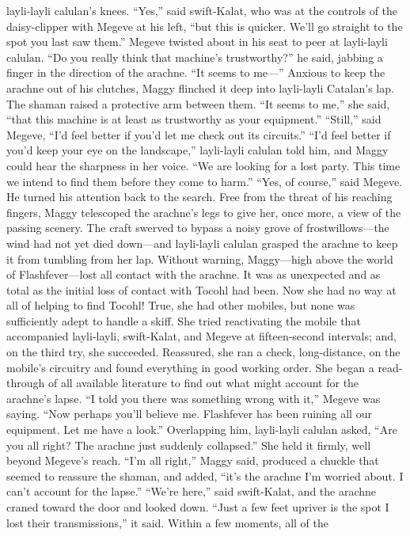 \documentclass[9pt]{article}
\begin{document}
layli-layli calulan’s knees.
“Yes,” said swift-Kalat, who was at the controls of the daisy-clipper with Megeve at his left, “but this
is quicker. We’ll go straight to the spot you last saw them.”
Megeve twisted about in his seat to peer at layli-layli calulan. “Do you really think that machine’s
trustworthy?” he said, jabbing a finger in the direction of the arachne. “It seems to me—”
Anxious to keep the arachne out of his clutches, Maggy flinched it deep into layli-layli Catalan’s
lap.
The shaman raised a protective arm between them. “It seems to me,” she said, “that this machine is at
least as trustworthy as your equipment.”
“Still,” said Megeve, “I’d feel better if you’d let me check out its circuits.”
“I’d feel better if you’d keep your eye on the landscape,” layli-layli calulan told him, and Maggy
could hear the sharpness in her voice. “We are looking for a lost party. This time we intend to find them
before they come to harm.”
“Yes, of course,” said Megeve. He turned his attention back to the search.
Free from the threat of his reaching fingers, Maggy telescoped the arachne’s legs to give her, once
more, a view of the passing scenery. The craft swerved to bypass a noisy grove of frostwillows—the
wind had not yet died down—and layli-layli calulan grasped the arachne to keep it from tumbling from
her lap.
Without warning, Maggy—high above the world of Flashfever—lost all contact with the arachne. It
was as unexpected and as total as the initial loss of contact with Tocohl had been.
Now she had no way at all of helping to find Tocohl!
True, she had other mobiles, but none was sufficiently adept to handle a skiff. She tried reactivating
the mobile that accompanied layli-layli, swift-Kalat, and Megeve at fifteen-second intervals; and, on the
third try, she succeeded. Reassured, she ran a check, long-distance, on the mobile’s circuitry and found
everything in good working order. She began a read-through of all available literature to find out what
might account for the arachne’s lapse.
“I told you there was something wrong with it,” Megeve was saying. “Now perhaps you’ll believe
me. Flashfever has been ruining all our equipment. Let me have a look.”
Overlapping him, layli-layli calulan asked, “Are you all right? The arachne just suddenly collapsed.”
She held it firmly, well beyond Megeve’s reach.
“I’m all right,” Maggy said, produced a chuckle that seemed to reassure the shaman, and added, “it’s
the arachne I’m worried about. I can’t account for the lapse.”
“We’re here,” said swift-Kalat, and the arachne craned toward the door and looked down.
“Just a few feet upriver is the spot I lost their transmissions,” it said. Within a few moments, all of the
\end{document}
